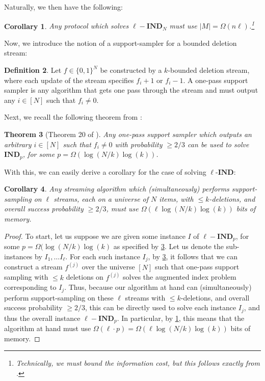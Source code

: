 \documentclass[11pt]{article}
\newtheorem{theorem}{Theorem}[section]
\newtheorem{corollary}[theorem]{Corollary}
\theoremstyle{definition}
\newtheorem{definition}[theorem]{Definition}
\newcommand{\zo}{\{0, 1\}}
\begin{document}
Naturally, we then have the following:

\begin{corollary}\label{cor:LBManyAugIndex}
    Any protocol which solves $\ell-\textbf{IND}_N$ must use $|M| = \Omega(n\ell)$.\footnote{Technically, we must bound the information cost, but this follows exactly from \cite{CK11}.}
\end{corollary}

Now, we introduce the notion of a support-sampler for a bounded deletion stream:

\begin{definition}
    Let $f \in \zo^N$ be constructed by a $k$-bounded deletion stream, where each update of the stream specifies $f_i + 1$ or $f_i - 1$. A one-pass support sampler is any algorithm that gets one pass through the stream and must output any $i \in [N]$ such that $f_i \neq 0$.
\end{definition}

Next, we recall the following theorem from \cite{JW18}:

\begin{theorem}[Theorem 20 of \cite{JW18}]\label{thm:JW18LB}
    Any one-pass support sampler which outputs an arbitrary $i \in [N]$ such that $f_i \neq 0$ with probability $\geq 2/3$ can be used to solve $\textbf{IND}_{p}$, for some $p = \Omega(\log(N/k)\log(k))$.
\end{theorem}

With this, we can easily derive a corollary for the case of solving $\ell$-$\textbf{IND}$:

\begin{corollary}
    Any streaming algorithm which (simultaneously) performs support-sampling on $\ell$ streams, each on a universe of $N$ items, with $\leq k$-deletions, and overall success probability $\geq 2/3$, must use $\Omega(\ell \log(N/k)\log(k))$ bits of memory.
\end{corollary}

\begin{proof}
    To start, let us suppose we are given some instance $I$ of $\ell-\textbf{IND}_{p}$, for some $p = \Omega(\log(N/k) \log(k)$ as specified by \cref{thm:JW18LB}. Let us denote the sub-instances by $I_1, \dots I_{\ell}$. For each such instance $I_j$, by \cref{thm:JW18LB}, it follows that we can construct a stream $f^{(j)}$ over the universe $[N]$ such that one-pass support sampling with $\leq k$ deletions on $f^{(j)}$ solves the augmented index problem corresponding to $I_j$. Thus, because our algorithm at hand can (simultaneously) perform support-sampling on these $\ell$ streams with $\leq k$-deletions, and overall success probability $\geq 2/3$, this can be directly used to solve each instance $I_j$, and thus the overall instance $\ell-\textbf{IND}_{p}$. In particular, by \cref{cor:LBManyAugIndex}, this means that the algorithm at hand must use $\Omega(\ell \cdot p) = \Omega(\ell \log(N/k)\log(k))$ bits of memory.
\end{proof}
\end{document}
